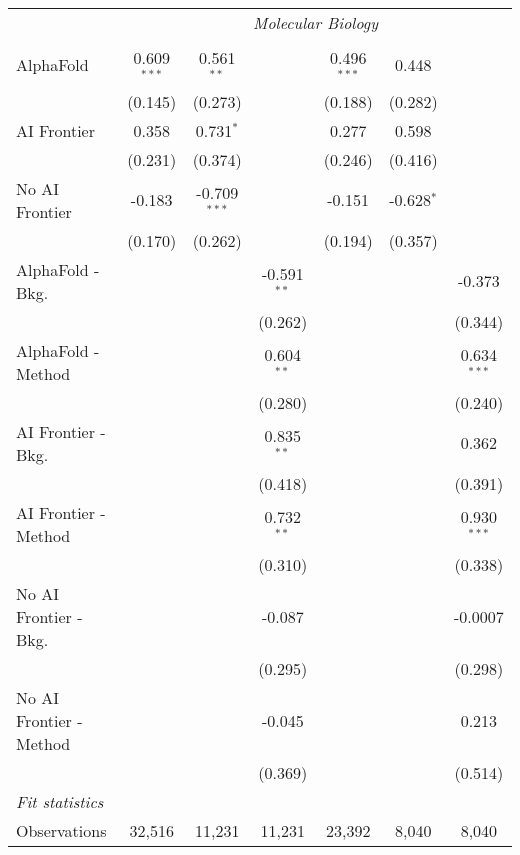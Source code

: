 \begin{tabular}{lcccccc}
 & \multicolumn{6}{c}{\textit{Molecular Biology}} \\ \\
   AlphaFold               & 0.609$^{***}$ & 0.561$^{**}$   &               & 0.496$^{***}$ & 0.448        &   \\   
                           & (0.145)       & (0.273)        &               & (0.188)       & (0.282)      &   \\   
   AI Frontier             & 0.358         & 0.731$^{*}$    &               & 0.277         & 0.598        &   \\   
                           & (0.231)       & (0.374)        &               & (0.246)       & (0.416)      &   \\   
   No AI Frontier          & -0.183        & -0.709$^{***}$ &               & -0.151        & -0.628$^{*}$ &   \\   
                           & (0.170)       & (0.262)        &               & (0.194)       & (0.357)      &   \\   
   AlphaFold - Bkg.        &               &                & -0.591$^{**}$ &               &              & -0.373\\   
                           &               &                & (0.262)       &               &              & (0.344)\\   
   AlphaFold - Method      &               &                & 0.604$^{**}$  &               &              & 0.634$^{***}$\\   
                           &               &                & (0.280)       &               &              & (0.240)\\   
   AI Frontier - Bkg.      &               &                & 0.835$^{**}$  &               &              & 0.362\\   
                           &               &                & (0.418)       &               &              & (0.391)\\   
   AI Frontier - Method    &               &                & 0.732$^{**}$  &               &              & 0.930$^{***}$\\   
                           &               &                & (0.310)       &               &              & (0.338)\\   
   No AI Frontier - Bkg.   &               &                & -0.087        &               &              & -0.0007\\   
                           &               &                & (0.295)       &               &              & (0.298)\\   
   No AI Frontier - Method &               &                & -0.045        &               &              & 0.213\\   
                           &               &                & (0.369)       &               &              & (0.514)\\   
   \midrule
   \emph{Fit statistics}\\
   Observations            & 32,516        & 11,231         & 11,231        & 23,392        & 8,040        & 8,040\\  
   

\end{tabular}
